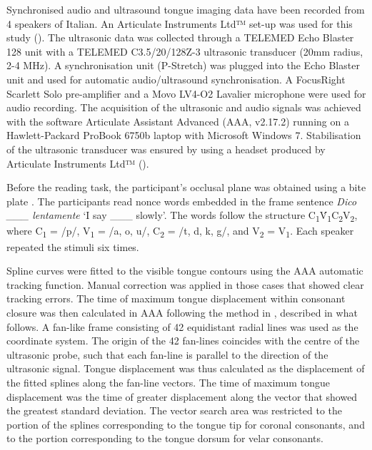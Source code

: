 \documentclass[12pt,]{article}
\begin{document}
\label{s:data}

Synchronised audio and ultrasound tongue imaging data have been recorded
from 4 speakers of Italian. An Articulate Instruments Ltd™ set-up was
used for this study (). The ultrasonic data was
collected through a TELEMED Echo Blaster 128 unit with a TELEMED
C3.5/20/128Z-3 ultrasonic transducer (20mm radius, 2-4 MHz). A
synchronisation unit (P-Stretch) was plugged into the Echo Blaster unit
and used for automatic audio/ultrasound synchronisation. A FocusRight
Scarlett Solo pre-amplifier and a Movo LV4-O2 Lavalier microphone were
used for audio recording. The acquisition of the ultrasonic and audio
signals was achieved with the software Articulate Assistant Advanced
(AAA, v2.17.2) running on a Hawlett-Packard ProBook 6750b laptop with
Microsoft Windows 7. Stabilisation of the ultrasonic transducer was
ensured by using a headset produced by Articulate Instruments Ltd™
(\citeyear{articulate2008}).

Before the reading task, the participant's occlusal plane was obtained
using a bite plate \citep{scobbie2011}. The participants read nonce
words embedded in the frame sentence \emph{Dico \_\_\_ lentamente} `I
say \_\_\_ slowly'. The words follow the structure
C\textsubscript{1}V́\textsubscript{1}C\textsubscript{2}V\textsubscript{2},
where C\textsubscript{1} = /p/, V\textsubscript{1} = /a, o, u/,
C\textsubscript{2} = /t, d, k, g/, and V\textsubscript{2} =
V\textsubscript{1}. Each speaker repeated the stimuli six times.

Spline curves were fitted to the visible tongue contours using the AAA
automatic tracking function. Manual correction was applied in those
cases that showed clear tracking errors. The time of maximum tongue
displacement within consonant closure was then calculated in AAA
following the method in \citet{strycharczuk2015}, described in what
follows. A fan-like frame consisting of 42 equidistant radial lines was
used as the coordinate system. The origin of the 42 fan-lines coincides
with the centre of the ultrasonic probe, such that each fan-line is
parallel to the direction of the ultrasonic signal. Tongue displacement
was thus calculated as the displacement of the fitted splines along the
fan-line vectors. The time of maximum tongue displacement was the time
of greater displacement along the vector that showed the greatest
standard deviation. The vector search area was restricted to the portion
of the splines corresponding to the tongue tip for coronal consonants,
and to the portion corresponding to the tongue dorsum for velar
consonants.
\end{document}
